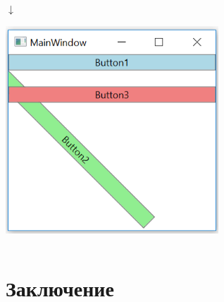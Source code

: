 \documentclass[xetex,mathserif,serif]{beamer}
\newcommand{\DownArrow} {
    \hspace{2cm}\begin{LARGE}$\downarrow$\end{LARGE}
}
\begin{document}
\begin{frame}[fragile]
\begin{columns}
\begin{column}{0.5\textwidth}
                \DownArrow
                \begin{center}
                    \includegraphics[width=0.6\textwidth]{renderTransform.png}
                \end{center}
            \end{column}
        \end{columns}
    \end{frame}

    \section{Заключение}
    
\end{document}

